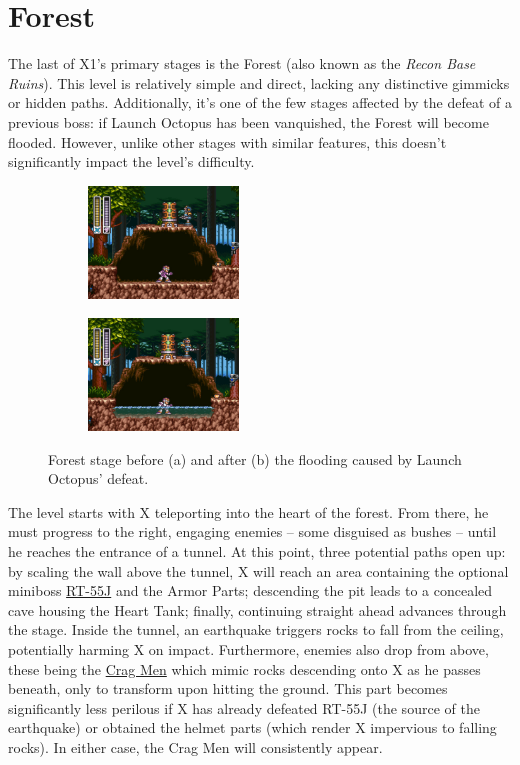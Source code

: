 \section{Forest}

The last of X1's primary stages is the Forest (also known as the \textit{Recon Base Ruins}). This level is relatively simple and direct, lacking any distinctive gimmicks or hidden paths. Additionally, it's one of the few stages affected by the defeat of a previous boss: if Launch Octopus has been vanquished, the Forest will become flooded. However, unlike other stages with similar features, this doesn't significantly impact the level's difficulty.

\begin{figure}[htp]
	\centering
	\begin{subfigure}{0.35\linewidth}
		\centering
		\includegraphics[height=3cm]{figures/X1/Sting_chameleon/Sting_no_water.jpg}
		\caption{}
	\end{subfigure}
	\begin{subfigure}{0.35\linewidth}
		\centering
		\includegraphics[height=3cm]{figures/X1/Sting_chameleon/Sting_water.jpg}
		\caption{}
	\end{subfigure}
	\caption{Forest stage before (a) and after (b) the flooding caused by Launch Octopus' defeat.}
\end{figure}
The level starts with X teleporting into the heart of the forest. From there, he must progress to the right, engaging enemies – some disguised as bushes – until he reaches the entrance of a tunnel. At this point, three potential paths open up: by scaling the wall above the tunnel, X will reach an area containing the optional miniboss \hyperlink{miniboss:RT-55J}{RT-55J} and the Armor Parts; descending the pit leads to a concealed cave housing the Heart Tank; finally, continuing straight ahead advances through the stage.
Inside the tunnel, an earthquake triggers rocks to fall from the ceiling, potentially harming X on impact. Furthermore, enemies also drop from above, these being the  \hyperlink{enem:Crag_Man}{Crag Men} which mimic rocks descending onto X as he passes beneath, only to transform upon hitting the ground. This part becomes significantly less perilous if X has already defeated RT-55J (the source of the earthquake) or obtained the helmet parts (which render X impervious to falling rocks). In either case, the Crag Men will consistently appear.
